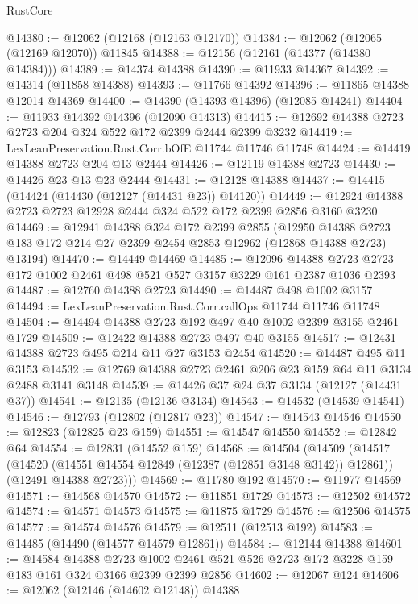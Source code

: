 \begin{lexlean}{RustCore}
\begin{coremodule}
@14380 := @12062 (@12168 (@12163 @12170))
@14384 := @12062 (@12065 (@12169 @12070)) @11845
@14388 := @12156 (@12161 (@14377 (@14380 @14384)))
@14389 := @14374 @14388
@14390 := @11933 @14367
@14392 := @14314 (@11858 @14388)
@14393 := @11766 @14392
@14396 := @11865 @14388 @12014 @14369
@14400 := @14390 (@14393 @14396) (@12085 @14241)
@14404 := @11933 @14392 @14396 (@12090 @14313)
@14415 := @12692 @14388 @2723 @2723 @204 @324 @522 @172 @2399 @2444 @2399 @3232
@14419 := LexLeanPreservation.Rust.Corr.bOfE @11744 @11746 @11748
@14424 := @14419 @14388 @2723 @204 @13 @2444
@14426 := @12119 @14388 @2723
@14430 := @14426 @23 @13 @23 @2444
@14431 := @12128 @14388
@14437 := @14415 (@14424 (@14430 (@12127 (@14431 @23)) @14120))
@14449 := @12924 @14388 @2723 @2723 @12928 @2444 @324 @522 @172 @2399 @2856 @3160 @3230
@14469 := @12941
    @14388
    @324
    @172
    @2399
    @2855
    (@12950 @14388 @2723 @183 @172 @214 @27 @2399 @2454 @2853 @12962 (@12868 @14388 @2723) @13194)
@14470 := @14449 @14469
@14485 := @12096
    @14388
    @2723
    @2723
    @172
    @1002
    @2461
    @498
    @521
    @527
    @3157
    @3229
    @161
    @2387
    @1036
    @2393
@14487 := @12760 @14388 @2723
@14490 := @14487 @498 @1002 @3157
@14494 := LexLeanPreservation.Rust.Corr.callOps @11744 @11746 @11748
@14504 := @14494 @14388 @2723 @192 @497 @40 @1002 @2399 @3155 @2461 @1729
@14509 := @12422 @14388 @2723 @497 @40 @3155
@14517 := @12431 @14388 @2723 @495 @214 @11 @27 @3153 @2454
@14520 := @14487 @495 @11 @3153
@14532 := @12769 @14388 @2723 @2461 @206 @23 @159 @64 @11 @3134 @2488 @3141 @3148
@14539 := @14426 @37 @24 @37 @3134 (@12127 (@14431 @37))
@14541 := @12135 (@12136 @3134)
@14543 := @14532 (@14539 @14541)
@14546 := @12793 (@12802 (@12817 @23))
@14547 := @14543 @14546
@14550 := @12823 (@12825 @23 @159)
@14551 := @14547 @14550
@14552 := @12842 @64
@14554 := @12831 (@14552 @159)
@14568 := @14504
    (@14509
      (@14517
        (@14520 (@14551 @14554 @12849 (@12387 (@12851 @3148 @3142)) @12861))
        (@12491 @14388 @2723)))
@14569 := @11780 @192
@14570 := @11977 @14569
@14571 := @14568 @14570
@14572 := @11851 @1729
@14573 := @12502 @14572
@14574 := @14571 @14573
@14575 := @11875 @1729
@14576 := @12506 @14575
@14577 := @14574 @14576
@14579 := @12511 (@12513 @192)
@14583 := @14485 (@14490 (@14577 @14579 @12861))
@14584 := @12144 @14388
@14601 := @14584
    @14388
    @2723
    @1002
    @2461
    @521
    @526
    @2723
    @172
    @3228
    @159
    @183
    @161
    @324
    @3166
    @2399
    @2399
    @2856
@14602 := @12067 @124
@14606 := @12062 (@12146 (@14602 @12148)) @14388

\end{coremodule}
\end{lexlean}
